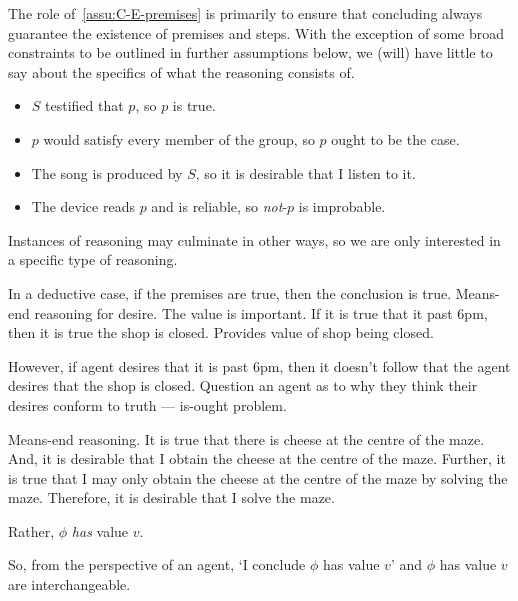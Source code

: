 \begin{note}
  The role of~\autoref{assu:C-E-premises} is primarily to ensure that concluding always guarantee the existence of premises and steps.
  With the exception of some broad constraints to be outlined in further assumptions below, we (will) have little to say about the specifics of what the reasoning consists of.
\end{note}

\begin{note}
  \begin{itemize}[noitemsep]
  \item \(S\) testified that \(p\), so \(p\) is true.
  \item \(p\) would satisfy every member of the group, so \(p\) ought to be the case.
  \item The song is produced by \(S\), so it is desirable that I listen to it.
  \item The device reads \(p\) and is reliable, so \emph{not}-\(p\) is improbable.
  \end{itemize}
\end{note}

\begin{note}
  Instances of reasoning may culminate in other ways, so we are only interested in a specific type of reasoning.
\end{note}

\begin{note}
  In a deductive case, if the premises are true, then the conclusion is true.
  Means-end reasoning for desire.
  The value is important.
  If it is true that it past 6pm, then it is true the shop is closed.
  Provides value of shop being closed.

  However, if agent desires that it is past 6pm, then it doesn't follow that the agent desires that the shop is closed.
  Question an agent as to why they think their desires conform to truth --- is-ought problem.

  Means-end reasoning.
  It is true that there is cheese at the centre of the maze.
  And, it is desirable that I obtain the cheese at the centre of the maze.
  Further, it is true that I may only obtain the cheese at the centre of the maze by solving the maze.
  Therefore, it is desirable that I solve the maze.
\end{note}

\begin{note}[`Concluding']
  Rather, \(\phi\) \emph{has} value \(v\).

  So, from the perspective of an agent, `I conclude \(\phi\) has value \(v\)' and \(\phi\) has value \(v\) are interchangeable.
\end{note}

